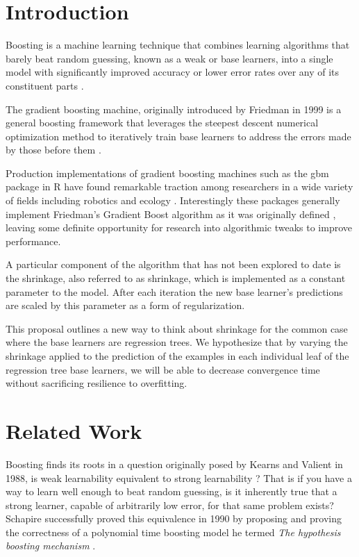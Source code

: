 \documentclass[9pt, conference]{IEEEtran}
\begin{document}
\section{Introduction}

Boosting is a machine learning technique that combines learning algorithms that barely beat random guessing, known as a weak or base learners, into a single model with significantly improved accuracy or lower error rates over any of its constituent parts \cite{StrengthOfWeak}  \cite{BoostingSurvey}. 

The gradient boosting machine, originally introduced by Friedman in 1999 is a general boosting framework that leverages the steepest descent numerical optimization method to iteratively train base learners to address the errors made by those before them \cite{2001Friedman}.

Production implementations of gradient boosting machines such as the gbm package in R have found remarkable traction among researchers in a wide variety of fields including robotics and ecology \cite{GBMTut} \cite{ecological}. Interestingly these packages generally implement Friedman's Gradient Boost algorithm as it was originally defined \cite{2012ridgeway}, leaving some definite opportunity for research into algorithmic tweaks to improve performance. 

A particular component of the algorithm that has not been explored to date is the shrinkage, also referred to as shrinkage, which is implemented as a constant parameter to the model. After each iteration the new base learner's predictions are scaled by this parameter as a form of regularization. 

This proposal outlines a new way to think about shrinkage for the common case where the base learners are regression trees. We hypothesize that by varying the shrinkage applied to the prediction of the examples in each individual leaf of the regression tree base learners, we will be able to decrease convergence time without sacrificing resilience to overfitting. 

\section{Related Work}
\label{sec:RelatedWork}
Boosting finds its roots in a question originally posed by Kearns and Valient in 1988, is weak learnability equivalent to strong learnability\cite{Kearns:1988} \cite{KearnsValient:1989}? That is if you have a way to learn well enough to beat random guessing, is it inherently true that a strong learner, capable of arbitrarily low error, for that same problem exists? Schapire successfully proved this equivalence in 1990 by proposing and proving the correctness of a polynomial time boosting model he termed \textit{The hypothesis boosting mechanism} \cite{StrengthOfWeak}. 
\end{document}
